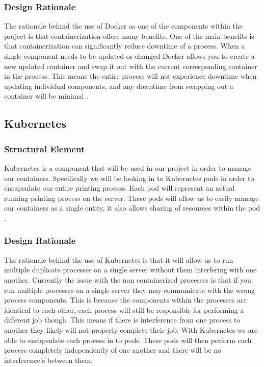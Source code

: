 \documentclass[onecolumn, draftclsnofoot,10pt, compsoc]{IEEEtran}
\begin{document}
\subsubsection{Design Rationale}
The rationale behind the use of Docker as one of the components within the project is that containerization offers many benefits. One of the main benefits is that containerization can significantly reduce downtime of a process. When a single component needs to be updated or changed Docker allows you to create a new updated container and swap it out with the current corresponding container in the process. This means the entire process will not experience downtime when updating individual components, and any downtime from swapping out a container will be minimal \cite{docker}. 

\subsection{Kubernetes}
\subsubsection{Structural Element}
Kubernetes is a component that will be used in our project in order to manage our containers. Specifically we will be looking in to Kubernetes pods in order to encapsulate our entire printing process. Each pod will represent an actual running printing process on the server. These pods will allow us to easily manage our containers as a single entity, it also allows sharing of resources within the pod \cite{kub}. 
\subsubsection{Design Rationale}
The rationale behind the use of Kubernetes is that it will allow us to run multiple duplicate processes on a single server without them interfering with one another. Currently the issue with the non containerized processes is that if you run multiple processes on a single server they may communicate with the wrong process components. This is because the components within the processes are identical to each other, each process will still be responsible for performing a different job though. This means if there is interference from one process to another they likely will not properly complete their job. With Kubernetes we are able to encapsulate each process in to pods. These pods will then perform each process completely independently of one another and there will be no interference's between them. 
\end{document}
